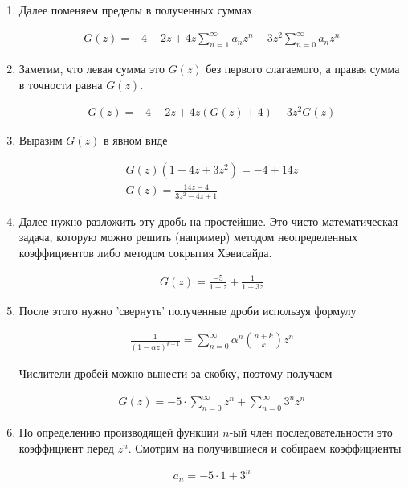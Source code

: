\begin{enumerate}
  \item Далее поменяем пределы в полученных суммах
  
  \begin{align*}
    G(z) = -4 - 2z + 4z \sum_{n = 1}^{\infty} a_{n} z^{n} - 
      3 z^{2} \sum_{n = 0}^{\infty} a_{n} z^{n}
  \end{align*}

  \item Заметим, что левая сумма это \(G(z)\) без первого слагаемого, а правая
  сумма в точности равна \(G(z)\).

  \begin{align*}
    G(z) = -4 - 2z + 4z (G(z) + 4) - 3z^2 G(z)
  \end{align*}

  \item Выразим \(G(z)\) в явном виде
  
  \begin{align*}
    G(z) (1 - 4z + 3z^2) = -4 + 14z \\
    G(z) = \frac{14z - 4}{3z^2 - 4z + 1}
  \end{align*}

  \item Далее нужно разложить эту дробь на простейшие. Это чисто математическая
  задача, которую можно решить (например) методом неопределенных коэффициентов
  либо методом сокрытия Хэвисайда.

  \begin{align*}
    G(z) = \frac{-5}{1 - z} + \frac{1}{1 - 3z}
  \end{align*}

  \item После этого нужно 'свернуть' полученные дроби используя формулу
  
  \begin{align*}
    \boxed{
      \frac{1}{(1 - \alpha z)^{k + 1}}
      = \sum_{n = 0}^{\infty} \alpha^{n} \binom{n + k}{k} z^{n}
    }
  \end{align*}

  Числители дробей можно вынести за скобку, поэтому получаем

  \begin{align*}
    G(z) = -5 \cdot \sum_{n = 0}^{\infty} z^{n}
      + \sum_{n = 0}^{\infty} 3^{n} z^{n}
  \end{align*}

  \item По определению производящей функции \(n\)-ый член последовательности
   это коэффициент перед \(z^{n}\). Смотрим на получившиеся и собираем
   коэффициенты

   \begin{align*}
     a_{n} = -5 \cdot 1 + 3^{n}
   \end{align*}
\end{enumerate}

